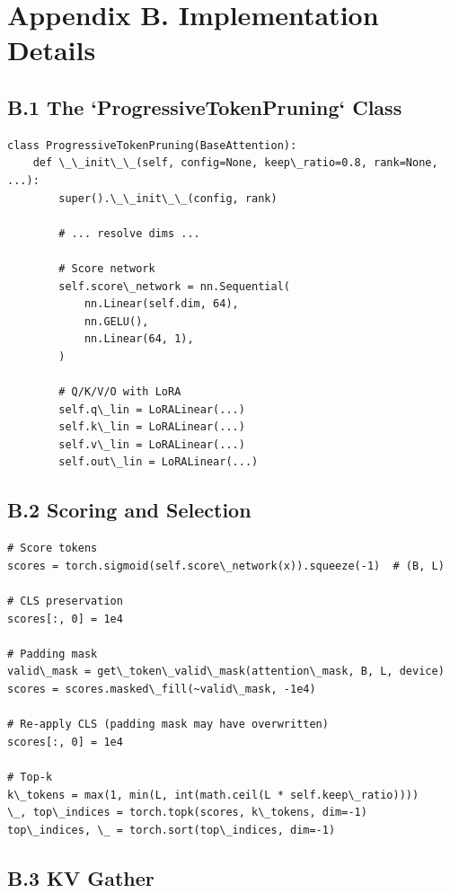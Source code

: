 
\section{Appendix B. Implementation Details}

\subsection{B.1 The `ProgressiveTokenPruning` Class}

\begin{lstlisting}
class ProgressiveTokenPruning(BaseAttention):
    def \_\_init\_\_(self, config=None, keep\_ratio=0.8, rank=None, ...):
        super().\_\_init\_\_(config, rank)
        
        # ... resolve dims ...
        
        # Score network
        self.score\_network = nn.Sequential(
            nn.Linear(self.dim, 64),
            nn.GELU(),
            nn.Linear(64, 1),
        )
        
        # Q/K/V/O with LoRA
        self.q\_lin = LoRALinear(...)
        self.k\_lin = LoRALinear(...)
        self.v\_lin = LoRALinear(...)
        self.out\_lin = LoRALinear(...)
\end{lstlisting}

\subsection{B.2 Scoring and Selection}

\begin{lstlisting}
# Score tokens
scores = torch.sigmoid(self.score\_network(x)).squeeze(-1)  # (B, L)

# CLS preservation
scores[:, 0] = 1e4

# Padding mask
valid\_mask = get\_token\_valid\_mask(attention\_mask, B, L, device)
scores = scores.masked\_fill(~valid\_mask, -1e4)

# Re-apply CLS (padding mask may have overwritten)
scores[:, 0] = 1e4

# Top-k
k\_tokens = max(1, min(L, int(math.ceil(L * self.keep\_ratio))))
\_, top\_indices = torch.topk(scores, k\_tokens, dim=-1)
top\_indices, \_ = torch.sort(top\_indices, dim=-1)
\end{lstlisting}

\subsection{B.3 KV Gather}

